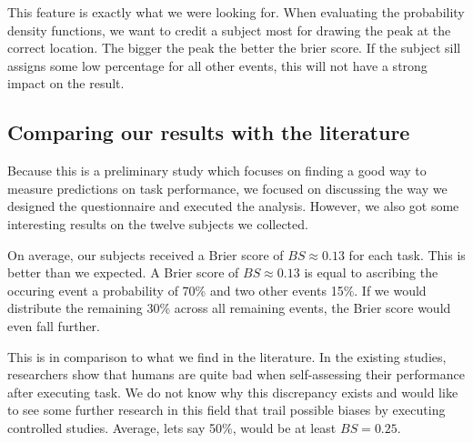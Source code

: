\documentclass[../main/main.tex]{subfiles}
\begin{document}
	This feature is exactly what we were looking for. When evaluating the probability density functions, we want to credit a subject most for drawing the peak at the correct location. The bigger the peak the better the brier score. If the subject sill assigns some low percentage for all other events, this will not have a strong impact on the result.
	
	\subsection{Comparing our results with the literature}
	
	Because this is a preliminary study which focuses on finding a good way to measure predictions on task performance, we focused on discussing the way we designed the questionnaire and executed the analysis. However, we also got some interesting results on the twelve subjects we collected.
	
	On average, our subjects received a Brier score of $BS \approx 0.13$ for each task. This is better than we expected. A Brier score of $BS \approx 0.13$ is equal to ascribing the occuring event a probability of 70\% and two other events 15\%. If we would distribute the remaining 30\% across all remaining events, the Brier score would even fall further. 
	
	This is in comparison to what we find in the literature. In the existing studies, researchers show that humans are quite bad when self-assessing their performance after executing task. We do not know why this discrepancy exists and would like to see some further research in this field that trail possible biases by executing controlled studies. Average, lets say 50\%, would be at least $BS = 0.25$.
	
	

	
	
\end{document}

